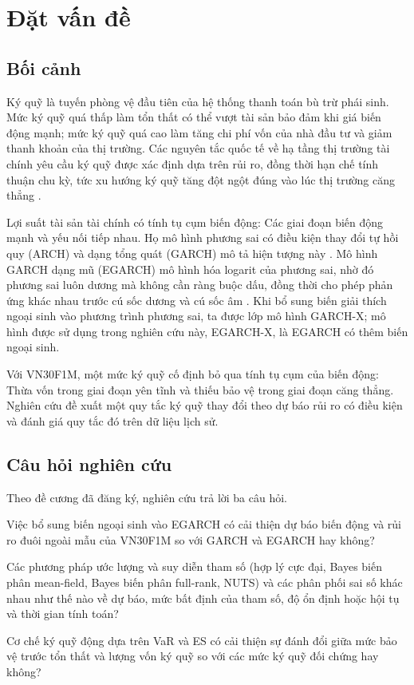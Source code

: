 \documentclass[12pt,a4paper]{article}
\theoremstyle{definition}
\theoremstyle{remark}
\begin{document}
\section{Đặt vấn đề}\label{sec:datvande}

\subsection{Bối cảnh}

Ký quỹ là tuyến phòng vệ đầu tiên của hệ thống thanh toán bù trừ phái sinh. Mức ký quỹ quá thấp làm tổn thất có thể vượt tài sản bảo đảm khi giá biến động mạnh; mức ký quỹ quá cao làm tăng chi phí vốn của nhà đầu tư và giảm thanh khoản của thị trường. Các nguyên tắc quốc tế về hạ tầng thị trường tài chính yêu cầu ký quỹ được xác định dựa trên rủi ro, đồng thời hạn chế tính thuận chu kỳ, tức xu hướng ký quỹ tăng đột ngột đúng vào lúc thị trường căng thẳng \cite{pfmi2012}.

Lợi suất tài sản tài chính có tính tụ cụm biến động: Các giai đoạn biến động mạnh và yếu nối tiếp nhau. Họ mô hình phương sai có điều kiện thay đổi tự hồi quy (ARCH) và dạng tổng quát (GARCH) mô tả hiện tượng này \cite{engle1982,bollerslev1986}. Mô hình GARCH dạng mũ (EGARCH) mô hình hóa logarit của phương sai, nhờ đó phương sai luôn dương mà không cần ràng buộc dấu, đồng thời cho phép phản ứng khác nhau trước cú sốc dương và cú sốc âm \cite{nelson1991}. Khi bổ sung biến giải thích ngoại sinh vào phương trình phương sai, ta được lớp mô hình GARCH-X; mô hình được sử dụng trong nghiên cứu này, EGARCH-X, là EGARCH có thêm biến ngoại sinh.

Với VN30F1M, một mức ký quỹ cố định bỏ qua tính tụ cụm của biến động: Thừa vốn trong giai đoạn yên tĩnh và thiếu bảo vệ trong giai đoạn căng thẳng. Nghiên cứu đề xuất một quy tắc ký quỹ thay đổi theo dự báo rủi ro có điều kiện và đánh giá quy tắc đó trên dữ liệu lịch sử.

\subsection{Câu hỏi nghiên cứu}

Theo đề cương đã đăng ký, nghiên cứu trả lời ba câu hỏi.
\begin{description}[leftmargin=0pt]
\item[CH1.] Việc bổ sung biến ngoại sinh vào EGARCH có cải thiện dự báo biến động và rủi ro đuôi ngoài mẫu của VN30F1M so với GARCH và EGARCH hay không?
\item[CH2.] Các phương pháp ước lượng và suy diễn tham số (hợp lý cực đại, Bayes biến phân mean-field, Bayes biến phân full-rank, NUTS) và các phân phối sai số khác nhau như thế nào về dự báo, mức bất định của tham số, độ ổn định hoặc hội tụ và thời gian tính toán?
\item[CH3.] Cơ chế ký quỹ động dựa trên VaR và ES có cải thiện sự đánh đổi giữa mức bảo vệ trước tổn thất và lượng vốn ký quỹ so với các mức ký quỹ đối chứng hay không?
\end{description}
\end{document}
